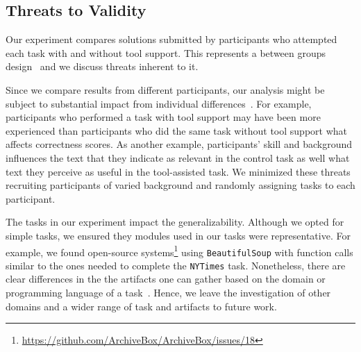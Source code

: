 
\clearpage

\subsection{Threats to Validity}
\label{cp6:threats}







Our experiment compares solutions submitted by participants who attempted each task with and without tool support. 
This represents a between groups design~\cite{Lazar2017-cp3} and we discuss threats inherent to it. 



Since we compare results from different participants, our analysis might be subject to substantial 
impact from individual differences~\cite{Lazar2017-cp3}. 
For example, participants who performed a task with tool support may have been more experienced than participants 
who did the same task without tool support what affects correctness scores.
As another example,  participants' skill and background 
influences the text that they indicate as relevant in the control task as well 
what text they perceive as useful in the tool-assisted task. 
We minimized these threats recruiting participants of varied background and randomly
assigning tasks to each participant.



The tasks in our experiment impact the generalizability. 
Although we opted for simple tasks, we ensured they 
modules used in our tasks were representative. 
For example, we found open-source systems\footnote{\url{https://github.com/ArchiveBox/ArchiveBox/issues/18}} using \texttt{BeautifulSoup} 
with function calls similar to the ones needed to complete the \texttt{NYTimes} task.
Nonetheless, there are clear differences in the the artifacts one can gather 
based on the domain or programming language of a task~\cite{baltes2020}.
Hence, we leave the investigation of other domains and a wider range of task 
and artifacts to future work. 




